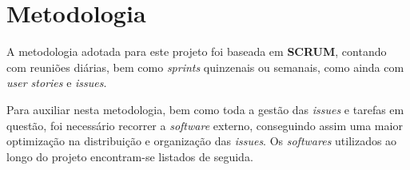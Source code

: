 
\section{Metodologia}

A metodologia adotada para este projeto foi baseada em \textbf{SCRUM}, contando com reuniões diárias, bem como \textit{sprints} quinzenais ou semanais, como ainda com \textit{user stories} e \textit{issues}.

Para auxiliar nesta metodologia, bem como toda a gestão das \textit{issues} e tarefas em questão, foi necessário recorrer a \textit{software} externo, conseguindo assim uma maior optimização na distribuição e organização das \textit{issues}. Os \textit{softwares} utilizados ao longo do projeto encontram-se listados de seguida.






